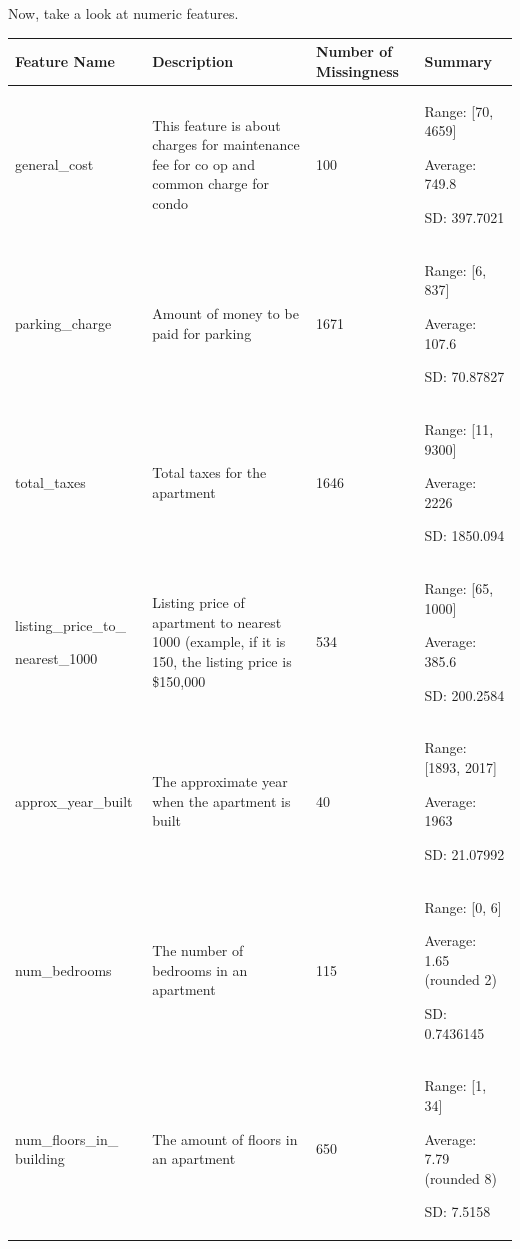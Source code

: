 \documentclass[12pt]{article}
\begin{document}
Now, take a look at numeric features.

\begin{table} [H]
    \centering
    \begin{tabular}{|p{3.5cm}|p{5.5cm}|p{2cm}|p{4cm}|}
        \hline
        Feature Name & Description & Number of Missingness & Summary \\
        \hline
        general\_cost & This feature is about charges for maintenance fee for co op and common charge for condo & 100 & Range: [70, 4659]
        
        Average: 749.8
        
        SD: 397.7021
        
        \\
        \hline
        parking\_charge & Amount of money to be paid for parking & 1671 & Range: [6, 837]
        
        Average: 107.6
        
        SD: 70.87827
        
        \\
        \hline
        total\_taxes & Total taxes for the apartment & 1646 &  Range: [11, 9300]
        
        Average: 2226
        
        SD: 1850.094
        
        \\
        \hline
        
        listing\_price\_to\_
        
        nearest\_1000 & Listing price of apartment to nearest 1000 (example, if it is 150, the listing price is \$150,000 & 534 & Range: [65, 1000]
        
        Average: 385.6
        
        SD: 200.2584
        
        \\
        \hline
        
        approx\_year\_built & The approximate year when the apartment is built & 40 & Range: [1893, 2017]
        
        Average: 1963
        
        SD: 21.07992
        
 \\
 \hline
        num\_bedrooms & The number of bedrooms in an apartment & 115 & Range: [0, 6]
        
        Average: 1.65 (rounded 2)
        
        SD: 0.7436145
        
         \\
         \hline
        num\_floors\_in\_
        building & The amount of floors in an apartment & 650 & Range: [1, 34]
        
Average: 7.79 (rounded 8)

SD: 7.5158

\\
\hline

    \end{tabular}
\end{table}
\end{document}
